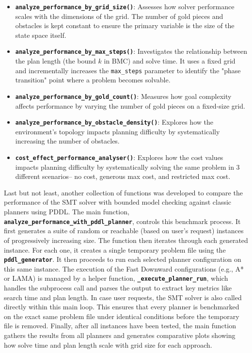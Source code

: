 \documentclass[12pt, a4paper, oneside]{report} %
\begin{document}
\begin{itemize}
    \item \textbf{\texttt{analyze\_performance\_by\_grid\_size()}}: Assesses how solver performance scales with the dimensions of the grid. The number of gold pieces and obstacles is kept constant to ensure the primary variable is the size of the state space itself.
    \item \textbf{\texttt{analyze\_performance\_by\_max\_steps()}}: Investigates the relationship between the plan length (the bound $k$ in BMC) and solve time. It uses a fixed grid and incrementally increases the \texttt{max\_steps} parameter to identify the "phase transition" point where a problem becomes solvable.
    \item \textbf{\texttt{analyze\_performance\_by\_gold\_count()}}: Measures how goal complexity affects performance by varying the number of gold pieces on a fixed-size grid.
    \item \textbf{\texttt{analyze\_performance\_by\_obstacle\_density()}}: Explores how the environment's topology impacts planning difficulty by systematically increasing the number of obstacles.
    \item \textbf{\texttt{cost\_effect\_performance\_analyser()}}: Explores how the cost values  impacts planning difficulty by systematically solving the same problem in 3 different scenarios-- no cost, generous max cost, and restricted max cost.
\end{itemize}
Last but not least, another collection of functions was developed to compare the performance of the SMT solver with bounded model checking against classic planners using PDDL. The main function, \textbf{\texttt{analyze\_performance\_with\_pddl\_planner}}, controls this benchmark process. It first generates a suite of random or reachable (based on user's request) instances of progressively increasing size. The function then iterates through each generated instance. For each one, it creates a single temporary problem file using the \textbf{\texttt{pddl\_generator}}. It then proceeds to run each selected planner configuration on this same instance. The execution of the Fast Downward configurations (e.g., A* or LAMA) is managed by a helper function, \textbf{\texttt{\_execute\_planner\_run}}, which handles the subprocess call and parses the output to extract key metrics like search time and plan length. In case user requests, the SMT solver is also called directly within this main loop. This ensures that every planner is benchmarked on the exact same problem file under identical conditions before the temporary file is removed. Finally, after all instances have been tested, the main function gathers the results from all planners and generates comparative plots showing how solve time and plan length scale with grid size for each approach.
\end{document}
